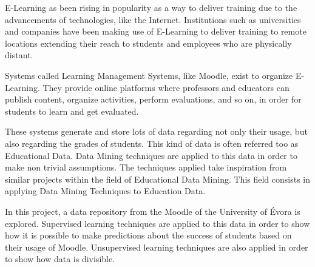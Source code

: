 \begin{tueABSTRACT}

E-Learning as been rising in popularity as a way to deliver training due to the
advancements of technologies, like the Internet. Institutions such as
universities and companies have been making use of E-Learning to deliver
training to remote locations extending their reach to students and employees
who are physically distant.

Systems called Learning Management Systems, like Moodle, exist to organize
E-Learning. They provide online platforms where professors and educators can
publish content, organize activities, perform evaluations, and so on, in order
for students to learn and get evaluated.

These systems generate and store lots of data regarding not only their usage,
but also regarding the grades of students. This kind of data is often referred
too as Educational Data. Data Mining techniques are applied to this data in
order to make non trivial assumptions. The techniques applied take inspiration
from similar projects within the field of Educational Data Mining. This field
consists in applying Data Mining Techniques to Education Data.

In this project, a data repository from the Moodle of the University of Évora
is explored. Supervised learning techniques are applied to this data in order
to show how it is possible to make predictions about the success of students
based on their usage of Moodle. Unsupervised learning techniques are also
applied in order to show how data is divisible.

\end{tueABSTRACT}
